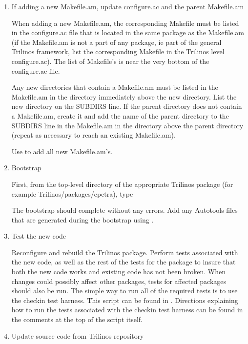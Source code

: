 \documentclass[12pt,relax]{TrilinosDevGuide}
\begin{document}
\begin{enumerate}
\item If adding a new Makefile.am, update configure.ac and the parent 
Makefile.am

When adding a new Makefile.am, the corresponding Makefile must be listed in 
the configure.ac file that is located in the same package as the 
Makefile.am (if the Makefile.am is not a part of any package, ie part of the 
general Trilinos framework, list the corresponding Makefile in the 
Trilinos level configure.ac).  The list of Makefile's is near the very bottom 
of the configure.ac file.

Any new directories that contain a Makefile.am must be listed in the 
Makefile.am in the directory immediately above the new directory.  List the 
new directory on the SUBDIRS line.  If the parent directory does not contain 
a Makefile.am, create it and add the name of the parent directory to the 
SUBDIRS line in the Makefile.am in the directory above the parent directory 
(repeat as necessary to reach an existing Makefile.am).

Use  to add all new Makefile.am's.
\item Bootstrap

First, from the top-level directory of the appropriate Trilinos package (for 
example Trilinos/packages/epetra), type 


The bootstrap should complete without any errors.  Add any Autotools 
files that are generated during the bootstrap using . 

\item Test the new code

Reconfigure and rebuild the Trilinos package.  Perform tests associated with 
the new code, as well as the rest of the tests for the package to insure that 
both the new code works and existing code has not been broken.  When changes 
could possibly affect other packages, tests for affected packages should also 
be run.  The simple way to run all of the required tests is to use the 
checkin test harness.  This script can be found in \newline
{}.  Directions 
explaining how to run the tests associated with the checkin test harness can 
be found in the comments at the top of the script itself.

\item Update source code from Trilinos repository


\end{enumerate}
\end{document}
